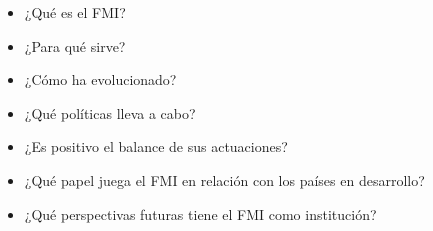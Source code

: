 \documentclass{nuevotema}
\begin{document}

\begin{itemize}
    \item ¿Qué es el FMI?
    \item ¿Para qué sirve?
    \item ¿Cómo ha evolucionado?
    \item ¿Qué políticas lleva a cabo?
    \item ¿Es positivo el balance de sus actuaciones?
    \item ¿Qué papel juega el FMI en relación con los países en desarrollo?
    \item ¿Qué perspectivas futuras tiene el FMI como institución?
\end{itemize}

\esquemacorto
\end{document}
